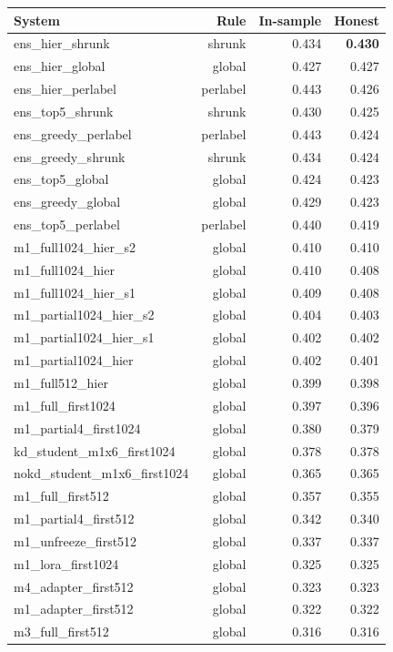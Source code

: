 \begin{table}[t]
\centering\small
\begin{tabular}{lrrr}
\toprule
System & Rule & In-sample & Honest \\
\midrule
ens\_hier\_shrunk & shrunk & 0.434 & \textbf{0.430} \\
ens\_hier\_global & global & 0.427 & 0.427 \\
ens\_hier\_perlabel & perlabel & 0.443 & 0.426 \\
ens\_top5\_shrunk & shrunk & 0.430 & 0.425 \\
ens\_greedy\_perlabel & perlabel & 0.443 & 0.424 \\
ens\_greedy\_shrunk & shrunk & 0.434 & 0.424 \\
ens\_top5\_global & global & 0.424 & 0.423 \\
ens\_greedy\_global & global & 0.429 & 0.423 \\
ens\_top5\_perlabel & perlabel & 0.440 & 0.419 \\
m1\_full1024\_hier\_s2 & global & 0.410 & 0.410 \\
m1\_full1024\_hier & global & 0.410 & 0.408 \\
m1\_full1024\_hier\_s1 & global & 0.409 & 0.408 \\
m1\_partial1024\_hier\_s2 & global & 0.404 & 0.403 \\
m1\_partial1024\_hier\_s1 & global & 0.402 & 0.402 \\
m1\_partial1024\_hier & global & 0.402 & 0.401 \\
m1\_full512\_hier & global & 0.399 & 0.398 \\
m1\_full\_first1024 & global & 0.397 & 0.396 \\
m1\_partial4\_first1024 & global & 0.380 & 0.379 \\
kd\_student\_m1x6\_first1024 & global & 0.378 & 0.378 \\
nokd\_student\_m1x6\_first1024 & global & 0.365 & 0.365 \\
m1\_full\_first512 & global & 0.357 & 0.355 \\
m1\_partial4\_first512 & global & 0.342 & 0.340 \\
m1\_unfreeze\_first512 & global & 0.337 & 0.337 \\
m1\_lora\_first1024 & global & 0.325 & 0.325 \\
m4\_adapter\_first512 & global & 0.323 & 0.323 \\
m1\_adapter\_first512 & global & 0.322 & 0.322 \\
m3\_full\_first512 & global & 0.316 & 0.316 \\

\end{tabular}
\end{table}
